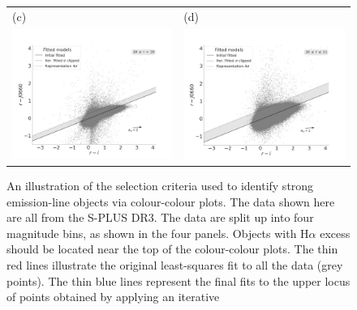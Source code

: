 \documentclass[fleqn,usenatbib]{mnras}
\begin{document}
\begin{figure}
\begin{tabular}{ll}
    (c) & (d) \\
    \includegraphics[trim=10 0 65 20, clip]{Figs/diagram-DR3-errorFlag0-3f-18r20}
    & \includegraphics[trim=10 0 65 20, clip]{Figs/diagram-DR3-errorFlag0-3f-20r21}\\
  \end{tabular}
  \caption{An illustration of the selection criteria used to identify strong emission-line objects via colour-colour plots. The data shown here are all from the
S-PLUS DR3. The data are split up into four magnitude bins, as shown in the four panels. Objects with H{$\alpha$} excess should be located near the top of the colour-colour plots. The thin red lines illustrate the original least-squares fit to all the data (grey points). The thin blue lines represent the final fits to the upper locus of points obtained by applying an iterative
}
\end{figure}
\end{document}

